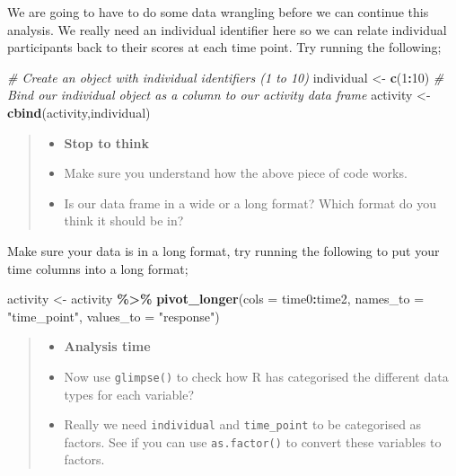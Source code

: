 \documentclass[
]{book}
\newenvironment{Shaded}{\begin{snugshade}}{\end{snugshade}}
\newcommand{\AttributeTok}[1]{\textcolor[rgb]{0.13,0.29,0.53}{#1}}
\newcommand{\CommentTok}[1]{\textcolor[rgb]{0.56,0.35,0.01}{\textit{#1}}}
\newcommand{\DecValTok}[1]{\textcolor[rgb]{0.00,0.00,0.81}{#1}}
\newcommand{\FunctionTok}[1]{\textcolor[rgb]{0.13,0.29,0.53}{\textbf{#1}}}
\newcommand{\NormalTok}[1]{#1}
\newcommand{\OtherTok}[1]{\textcolor[rgb]{0.56,0.35,0.01}{#1}}
\newcommand{\SpecialCharTok}[1]{\textcolor[rgb]{0.81,0.36,0.00}{\textbf{#1}}}
\newcommand{\StringTok}[1]{\textcolor[rgb]{0.31,0.60,0.02}{#1}}
\providecommand{\tightlist}{%
  \setlength{\itemsep}{0pt}\setlength{\parskip}{0pt}}
\begin{document}
We are going to have to do some data wrangling before we can continue this analysis. We really need an individual identifier here so we can relate individual participants back to their scores at each time point. Try running the following;

\begin{Shaded}
\begin{Highlighting}[]
\CommentTok{\# Create an object with individual identifiers (1 to 10)}
\NormalTok{individual }\OtherTok{\textless{}{-}} \FunctionTok{c}\NormalTok{(}\DecValTok{1}\SpecialCharTok{:}\DecValTok{10}\NormalTok{)}
\CommentTok{\# Bind our \textasciigrave{}individual\textasciigrave{} object as a column to our \textasciigrave{}activity\textasciigrave{} data frame}
\NormalTok{activity }\OtherTok{\textless{}{-}} \FunctionTok{cbind}\NormalTok{(activity,individual)}
\end{Highlighting}
\end{Shaded}

\begin{quote}
\begin{itemize}
\tightlist
\item
  \textbf{Stop to think}
\item
  Make sure you understand how the above piece of code works.
\item
  Is our data frame in a wide or a long format? Which format do you think it should be in?
\end{itemize}
\end{quote}

Make sure your data is in a long format, try running the following to put your time columns into a long format;

\begin{Shaded}
\begin{Highlighting}[]
\NormalTok{activity }\OtherTok{\textless{}{-}}\NormalTok{ activity }\SpecialCharTok{\%\textgreater{}\%}
  \FunctionTok{pivot\_longer}\NormalTok{(}\AttributeTok{cols =}\NormalTok{ time0}\SpecialCharTok{:}\NormalTok{time2,}
               \AttributeTok{names\_to =} \StringTok{"time\_point"}\NormalTok{, }
               \AttributeTok{values\_to =} \StringTok{"response"}\NormalTok{)}
\end{Highlighting}
\end{Shaded}

\begin{quote}
\begin{itemize}
\tightlist
\item
  \textbf{Analysis time}
\item
  Now use \texttt{glimpse()} to check how R has categorised the different data types for each variable?
\item
  Really we need \texttt{individual} and \texttt{time\_point} to be categorised as factors. See if you can use \texttt{as.factor()} to convert these variables to factors.
\end{itemize}
\end{quote}
\end{document}
